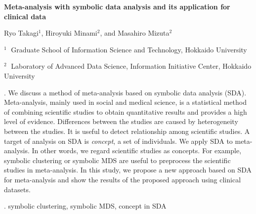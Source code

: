 \documentclass[12pt]{article}
\begin{document}
\begin{flushleft}


{\LARGE\bf Meta-analysis with symbolic data analysis and its application for clinical data}


\vspace{1.0cm}

Ryo Takagi$^1$, Hiroyuki Minami$^2$, and Masahiro Mizuta$^2$

\begin{description}

\item $^1 \;$ Graduate School of Information Science and Technology, Hokkaido University

\item $^2 \;$ Laboratory of Advanced Data Science, Information Initiative Center, Hokkaido University

\end{description}

\end{flushleft}


\vspace{0.75cm}

. We discuss a method of meta-analysis based on symbolic data analysis (SDA). Meta-analysis, mainly used in social and medical science, is a statistical method of combining scientific studies to obtain quantitative results and provides a high level of evidence. Differences between the studies are caused by heterogeneity between the studies. It is useful to detect relationship among scientific studies. A target of analysis on SDA is {\it concept}, a set of individuals. We apply SDA to meta-analysis. In other words, we regard scientific studies as concepts. For example, symbolic clustering or symbolic MDS are useful to preprocess the scientific studies in meta-analysis. In this study, we propose a new approach based on SDA for meta-analysis and show the results of the proposed approach using clinical datasets.

\vskip 2mm

.
symbolic clustering, symbolic MDS, concept in SDA
\end{document}
